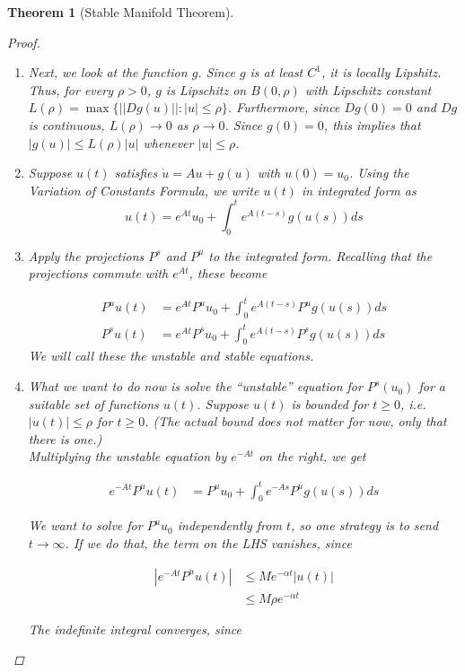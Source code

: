 \documentclass{article}
\newtheorem{theorem}{Theorem}[section]
\begin{document}
\begin{theorem}[Stable Manifold Theorem]
\begin{proof}
\begin{enumerate}
\item Next, we look at the function $g$. Since $g$ is at least $C^1$, it is locally Lipshitz. Thus, for every $\rho > 0$, $g$ is Lipschitz on $B(0, \rho)$ with Lipschitz constant $L(\rho) = \max\{||Dg(u)||: |u| \leq \rho\}$. Furthermore, since $Dg(0) = 0$ and $Dg$ is continuous, $L(\rho) \rightarrow 0$ as $\rho \rightarrow 0$. Since $g(0) = 0$, this implies that $|g(u)| \leq L(\rho)|u|$ whenever $|u| \leq \rho$.

\item Suppose $u(t)$ satisfies $\dot{u} = Au + g(u)$ with $u(0) = u_0$. Using the Variation of Constants Formula, we write $u(t)$ in integrated form as
\[
u(t) = e^{At} u_0 + \int_0^t e^{A(t-s)}g(u(s)) ds
\]

\item Apply the projections $P^s$ and $P^u$ to the integrated form. Recalling that the projections commute with $e^{At}$, these become

\begin{align*}
P^u u(t) &= e^{At} P^u u_0 + \int_0^t e^{A(t-s)} P^u g(u(s)) ds \\
P^s u(t) &= e^{At} P^s u_0 + \int_0^t e^{A(t-s)} P^s g(u(s)) ds
\end{align*}
We will call these the unstable and stable equations. 

\item What we want to do now is solve the ``unstable'' equation for $P^s(u_0)$ for a suitable set of functions $u(t)$. Suppose $u(t)$ is bounded for $t \geq 0$, i.e. $|u(t)| \leq \rho$ for $t \geq 0$. (The actual bound does not matter for now, only that there is one.)\\

Multiplying the unstable equation by $e^{-At}$ on the right, we get

\begin{align*}
e^{-At} P^u u(t) &= P^u u_0 + \int_0^t e^{-As} P^u g(u(s)) ds
\end{align*}

We want to solve for $P^u u_0$ independently from $t$, so one strategy is to send $t \rightarrow \infty$. If we do that, the term on the LHS vanishes, since

\begin{align*}
| e^{-At} P^u u(t) | &\leq M e^{-\alpha t} |u(t)| \\
&\leq M \rho e^{-\alpha t}
\end{align*}

The indefinite integral converges, since


\end{enumerate}
\end{proof}
\end{theorem}
\end{document}
